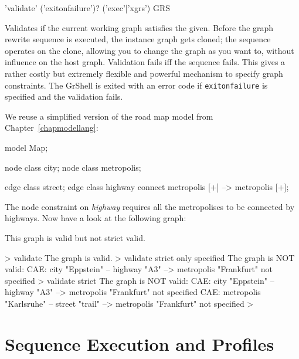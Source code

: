 \begin{rail}
  'validate' ('exitonfailure')? ('exec'|'xgrs') GRS
\end{rail}
Validates if the current working graph satisfies the  given.
Before the graph rewrite sequence is executed, the instance graph gets cloned;
the sequence operates on the clone, allowing you to change the graph as you want to, without influence on the host graph.
Validation fails iff the sequence fails.
This gives a rather costly but extremely flexible and powerful mechanism to specify graph constraints.
The GrShell is exited with an error code if \texttt{exitonfailure} is specified and the validation fails.

\begin{example}
We reuse a simplified version of the road map model from Chapter~\ref{chapmodellang}:
\begin{grgen}
model Map;

node class city;
node class metropolis;

edge class street;
edge class highway
      connect metropolis [+] --> metropolis [+];
\end{grgen}
The node constraint on \emph{highway} requires all the metropolises to be connected by highways. Now have a look at the following graph:
\begin{center}
\end{center}

This graph is valid but not strict valid.
\begin{grshell}
> validate
The graph is valid.
> validate strict only specified
The graph is NOT valid:
  CAE: city "Eppstein" -- highway "A3" --> metropolis "Frankfurt" not specified
> validate strict
The graph is NOT valid:
  CAE: city "Eppstein" -- highway "A3" --> metropolis "Frankfurt" not specified
  CAE: metropolis "Karlsruhe" -- street "trail" --> metropolis "Frankfurt" not specified
>
\end{grshell}
\end{example}


\pagebreak

\section{Sequence Execution and Profiles}\label{grsthings}

